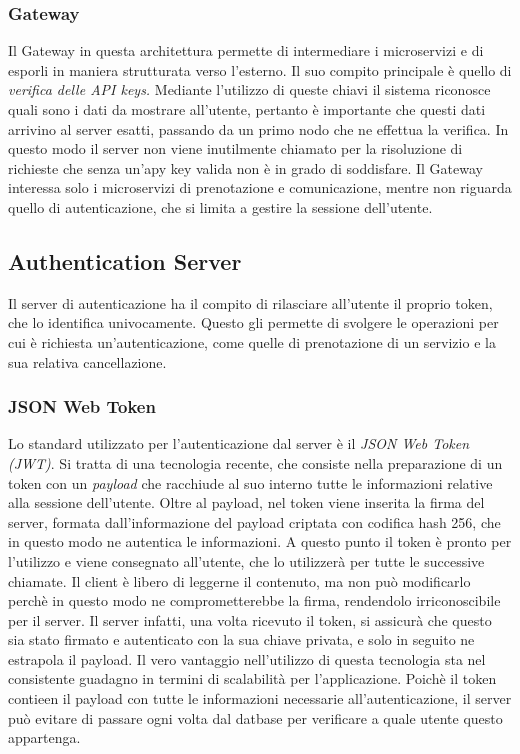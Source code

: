 \subsubsection{Gateway}
Il Gateway in questa architettura permette di intermediare i microservizi e di esporli in maniera strutturata verso l'esterno. Il suo compito principale è quello di \emph{verifica delle API keys.} Mediante l'utilizzo di queste chiavi il sistema riconosce quali sono i dati da mostrare all'utente, pertanto è importante che questi dati arrivino al server esatti, passando da un primo nodo che ne effettua la verifica. In questo modo il server non viene inutilmente chiamato per la risoluzione di richieste che senza un'apy key valida non è in grado di soddisfare. Il Gateway interessa solo i microservizi di prenotazione e comunicazione, mentre non riguarda quello di autenticazione, che si limita a gestire la sessione dell'utente.

\subsection{Authentication Server}
Il server di autenticazione ha il compito di rilasciare all'utente il proprio token, che lo identifica univocamente. Questo gli permette di svolgere le operazioni per cui è richiesta un'autenticazione, come quelle di prenotazione di un servizio e la sua relativa cancellazione. 

\subsubsection{JSON Web Token}
Lo standard utilizzato per l'autenticazione dal server è il \emph{JSON Web Token (JWT)}. Si tratta di una tecnologia recente, che consiste nella preparazione di un token con un \textit{payload} che racchiude al suo interno tutte le informazioni relative alla sessione dell'utente. Oltre al payload, nel token viene inserita la firma del server, formata dall'informazione del payload criptata con codifica hash 256, che in questo modo ne autentica le informazioni. A questo punto il token è pronto per l'utilizzo e viene consegnato all'utente, che lo utilizzerà per tutte le successive chiamate. Il client è libero di leggerne il contenuto, ma non può modificarlo perchè in questo modo ne comprometterebbe la firma, rendendolo irriconoscibile per il server. Il server infatti, una volta ricevuto il token, si assicurà che questo sia stato firmato e autenticato con la sua chiave privata, e solo in seguito ne estrapola il payload. Il vero vantaggio nell'utilizzo di questa tecnologia sta nel consistente guadagno in termini di scalabilità per l'applicazione. Poichè il token contieen il payload con tutte le informazioni necessarie all'autenticazione, il server può evitare di passare ogni volta dal datbase per verificare a quale utente questo appartenga.

